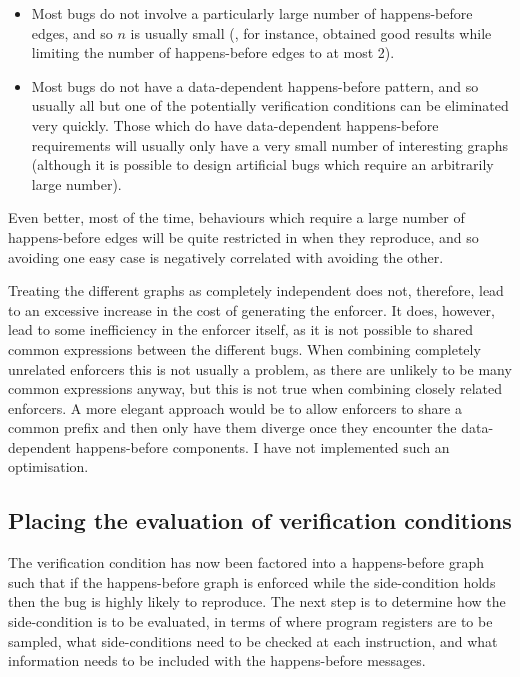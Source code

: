 \begin{itemize}
\item
  Most bugs do not involve a particularly large number of
  happens-before edges, and so $n$ is usually small (, for instance, obtained good
  results while limiting the number of happens-before edges to at most
  2).
\item
  Most bugs do not have a data-dependent happens-before pattern, and
  so usually all but one of the potentially verification conditions
  can be eliminated very quickly.  Those which do have data-dependent
  happens-before requirements will usually only have a very small
  number of interesting graphs (although it is possible to design
  artificial bugs which require an arbitrarily large number).
\end{itemize}

Even better, most of the time, behaviours which require a large number
of happens-before edges will be quite restricted in when they
reproduce, and so avoiding one easy case is negatively correlated with
avoiding the other.

Treating the different graphs as completely independent does not,
therefore, lead to an excessive increase in the cost of generating the
enforcer.  It does, however, lead to some inefficiency in the enforcer
itself, as it is not possible to shared common expressions between the
different bugs.  When combining completely unrelated enforcers this is
not usually a problem, as there are unlikely to be many common
expressions anyway, but this is not true when combining closely
related enforcers.  A more elegant approach would be to allow
enforcers to share a common prefix and then only have them diverge
once they encounter the data-dependent happens-before components.  I
have not implemented such an optimisation.

\subsection{Placing the evaluation of verification conditions}
\label{sect:enforce:place_vcs}
The verification condition has now been factored into a happens-before
graph such that if the happens-before graph is enforced while the
side-condition holds then the bug is highly likely to reproduce.  The
next step is to determine how the side-condition is to be evaluated,
in terms of where program registers are to be sampled, what
side-conditions need to be checked at each instruction, and what
information needs to be included with the happens-before messages.

